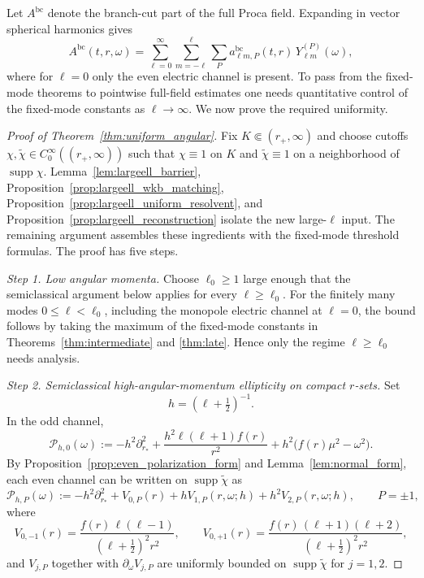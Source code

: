 \documentclass[12pt]{article}
\numberwithin{equation}{section}
\theoremstyle{plain}
\theoremstyle{definition}
\theoremstyle{remark}
\newcommand{\bc}{\mathrm{bc}}
\newcommand{\om}{\omega}
\begin{document}
Let $A^{\bc}$ denote the branch-cut part of the full Proca field.  Expanding in vector spherical harmonics gives
\begin{equation}\label{eq:full_field_decomp}
   A^{\bc}(t,r,\omega)
   =
   \sum_{\ell=0}^\infty\sum_{m=-\ell}^{\ell}\sum_{P}
   a_{\ell m,P}^{\bc}(t,r)\,Y_{\ell m}^{(P)}(\omega),
\end{equation}
where for $\ell=0$ only the even electric channel is present.  To pass from the fixed-mode theorems to pointwise full-field estimates one needs quantitative control of the fixed-mode constants as $\ell\to\infty$.  We now prove the required uniformity.

\begin{proof}[Proof of Theorem~\ref{thm:uniform_angular}]
Fix $K\Subset(r_+,\infty)$ and choose cutoffs $\chi,\widetilde\chi\in C_0^\infty((r_+,\infty))$ such that $\chi\equiv1$ on $K$ and $\widetilde\chi\equiv1$ on a neighborhood of $\operatorname{supp}\chi$.  Lemma~\ref{lem:largeell_barrier}, Proposition~\ref{prop:largeell_wkb_matching}, Proposition~\ref{prop:largeell_uniform_resolvent}, and Proposition~\ref{prop:largeell_reconstruction} isolate the new large-$\ell$ input.  The remaining argument assembles these ingredients with the fixed-mode threshold formulas.  The proof has five steps.

\smallskip
\noindent\textit{Step 1. Low angular momenta.}
Choose $\ell_0\ge1$ large enough that the semiclassical argument below applies for every $\ell\ge\ell_0$.  For the finitely many modes $0\le\ell<\ell_0$, including the monopole electric channel at $\ell=0$, the bound follows by taking the maximum of the fixed-mode constants in Theorems~\ref{thm:intermediate} and \ref{thm:late}.  Hence only the regime $\ell\ge\ell_0$ needs analysis.

\smallskip
\noindent\textit{Step 2. Semiclassical high-angular-momentum ellipticity on compact $r$-sets.}
Set
\[
   h=(\ell+\tfrac12)^{-1}.
\]
In the odd channel,
\begin{equation}\label{eq:uniform_angular_odd_scaled}
   \mathcal P_{h,0}(\om)
   :=
   -h^2\partial_{r_*}^2
   +\frac{h^2\ell(\ell+1)f(r)}{r^2}
   +h^2\bigl(f(r)\mu^2-\om^2\bigr).
\end{equation}
By Proposition~\ref{prop:even_polarization_form} and Lemma~\ref{lem:normal_form}, each even channel can be written on $\operatorname{supp}\widetilde\chi$ as
\begin{equation}\label{eq:uniform_angular_even_scaled}
   \mathcal P_{h,P}(\om)
   :=
   -h^2\partial_{r_*}^2
   +V_{0,P}(r)
   +hV_{1,P}(r,\om;h)
   +h^2V_{2,P}(r,\om;h),
   \qquad P=\pm1,
\end{equation}
where
\[
   V_{0,-1}(r)=\frac{f(r)\,\ell(\ell-1)}{(\ell+\tfrac12)^2r^2},
   \qquad
   V_{0,+1}(r)=\frac{f(r)\,(\ell+1)(\ell+2)}{(\ell+\tfrac12)^2r^2},
\]
and $V_{j,P}$ together with $\partial_\om V_{j,P}$ are uniformly bounded on $\operatorname{supp}\widetilde\chi$ for $j=1,2$.


\end{proof}
\end{document}
